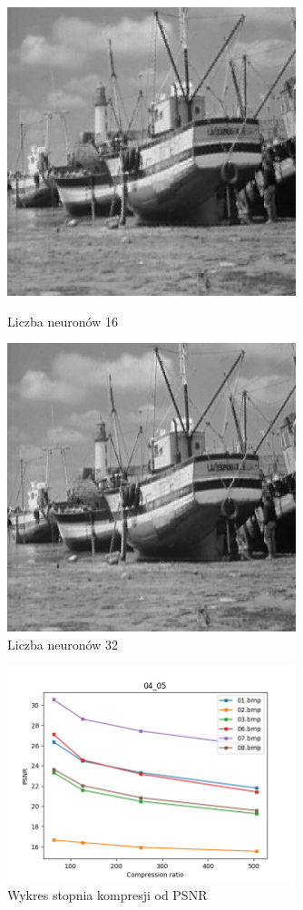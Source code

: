 \documentclass[../EDI_Task4_Karwowski_Kowalewski.tex]{subfiles}
\begin{document}
{    \begin{figure}[!htbp]
        \begin{minipage}[c]{0.49\linewidth}
            \centering
            \includegraphics[width=0.75\textwidth]{img/results_4/16/compressed_03.png}
            \caption{Liczba neuronów 16}
        \end{minipage}\hfill
        \begin{minipage}[c]{0.49\linewidth}
            \centering
            \includegraphics[width=0.75\textwidth]{img/results_4/32/compressed_03.png}
            \caption{Liczba neuronów 32}
        \end{minipage}
    \end{figure}

    \begin{figure}[!htbp]
        \centering
        \includegraphics[width=0.75\textwidth]{img/results_4/stats_04_05.png}
        \caption{Wykres stopnia kompresji od PSNR}
    \end{figure}
    \FloatBarrier
}
\end{document}
